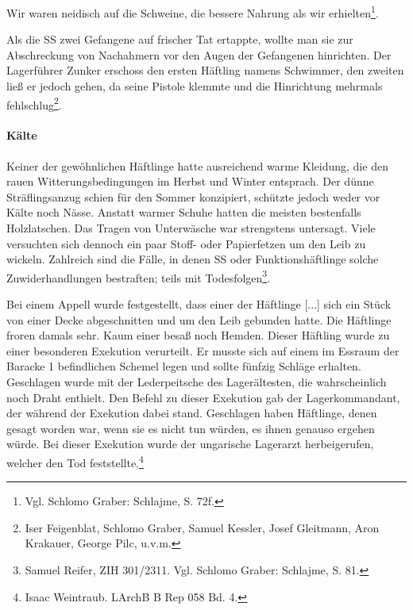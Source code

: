 \begin{leftbar}
Wir waren neidisch auf die Schweine, die bessere Nahrung als wir erhielten\footnote{Vgl. Schlomo Graber: Schlajme, S. 72f.}.
\end{leftbar}

Als die SS zwei Gefangene auf frischer Tat ertappte, wollte man sie zur Abschreckung von Nachahmern vor den Augen der Gefangenen hinrichten. Der Lagerführer Zunker erschoss den ersten Häftling namens Schwimmer, den zweiten ließ er jedoch gehen, da seine Pistole klemmte und die Hinrichtung mehrmals fehlschlug\footnote{Iser Feigenblat, Schlomo Graber, Samuel Kessler, Josef Gleitmann, Aron Krakauer, George Pilc, u.v.m.}.

\paragraph{Kälte}
Keiner der gewöhnlichen Häftlinge hatte ausreichend warme Kleidung, die den rauen Witterungsbedingungen im Herbst und Winter entsprach. Der dünne Sträflingsanzug schien für den Sommer konzipiert, schützte jedoch weder vor Kälte noch Nässe. Anstatt warmer Schuhe hatten die meisten bestenfalls Holzlatschen. Das Tragen von Unterwäsche war strengstens untersagt. Viele versuchten sich dennoch ein paar Stoff- oder Papierfetzen um den Leib zu wickeln. Zahlreich sind die Fälle, in denen SS oder Funktionshäftlinge solche Zuwiderhandlungen bestraften; teils mit Todesfolgen\footnote{Samuel Reifer, ZIH 301/2311. Vgl. Schlomo Graber: Schlajme, S. 81.}.

\begin{leftbar}
Bei einem Appell wurde festgestellt, dass einer der Häftlinge [...] sich ein Stück von einer Decke abgeschnitten und um den Leib gebunden hatte. Die Häftlinge froren damals sehr. Kaum einer besaß noch Hemden. Dieser Häftling wurde zu einer besonderen Exekution verurteilt. Er musste sich auf einem im Essraum der Baracke 1 befindlichen Schemel legen und sollte fünfzig Schläge erhalten. Geschlagen wurde mit der Lederpeitsche des Lagerältesten, die wahrscheinlich noch Draht enthielt. Den Befehl zu dieser Exekution gab der Lagerkommandant, der während der Exekution dabei stand. Geschlagen haben Häftlinge, denen gesagt worden war, wenn sie es nicht tun würden, es ihnen genauso ergehen würde. Bei dieser Exekution wurde der ungarische Lagerarzt herbeigerufen, welcher den Tod feststellte.\footnote{Isaac Weintraub. LArchB B Rep 058 Bd. 4.}
\end{leftbar}




